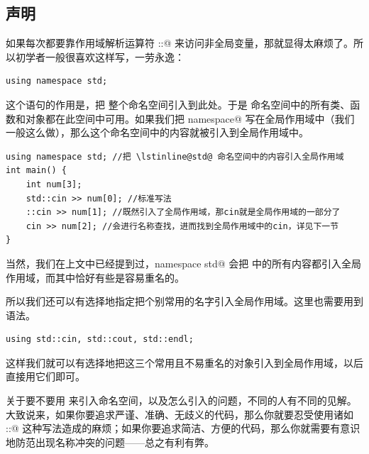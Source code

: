 \subsection*{\lstinline@using@ 声明}
如果每次都要靠作用域解析运算符 \lstinline@::@ 来访问非全局变量，那就显得太麻烦了。所以初学者一般很喜欢这样写，一劳永逸：
\begin{lstlisting}
using namespace std;
\end{lstlisting}
这个语句的作用是，把 \lstinline@std@ 整个命名空间引入到此处。于是 \lstinline@std@ 命名空间中的所有类、函数和对象都在此空间中可用。如果我们把 \lstinline@using namespace@ 写在全局作用域中（我们一般这么做），那么这个命名空间中的内容就被引入到全局作用域中。
\begin{lstlisting}
using namespace std; //把 \lstinline@std@ 命名空间中的内容引入全局作用域
int main() {
    int num[3];
    std::cin >> num[0]; //标准写法
    ::cin >> num[1]; //既然引入了全局作用域，那cin就是全局作用域的一部分了
    cin >> num[2]; //会进行名称查找，进而找到全局作用域中的cin，详见下一节
}
\end{lstlisting}
当然，我们在上文中已经提到过，\lstinline@using namespace std@ 会把 \lstinline@std@ 中的所有内容都引入全局作用域，而其中恰好有些是容易重名的。\par
所以我们还可以有选择地指定把个别常用的名字引入全局作用域。这里也需要用到 \lstinline@using@ 语法。
\begin{lstlisting}
using std::cin, std::cout, std::endl;
\end{lstlisting}
这样我们就可以有选择地把这三个常用且不易重名的对象引入到全局作用域，以后直接用它们即可。\par
关于要不要用 \lstinline@using@ 来引入命名空间，以及怎么引入的问题，不同的人有不同的见解。大致说来，如果你要追求严谨、准确、无歧义的代码，那么你就要忍受使用诸如 \lstinline@std::@ 这种写法造成的麻烦；如果你要追求简洁、方便的代码，那么你就需要有意识地防范出现名称冲突的问题——总之有利有弊。\par
